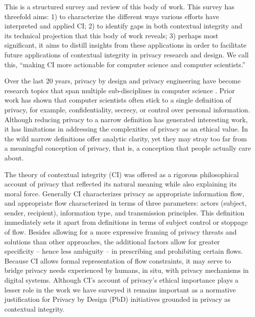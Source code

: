 \documentclass[../thesis.tex]{subfiles}
\begin{document}
This is a structured survey and review of this body of work. This survey
has threefold aims: 1) to characterize the different ways various
efforts have interpreted and applied CI; 2) to identify gaps in both
contextual integrity and its technical projection that this body of
work reveals; 3) perhaps most significant, it aims to distill insights
from these applications in order to facilitate future applications of
contextual integrity in privacy research and design. We call this,
``making CI more actionable for computer science and
computer scientists.''

Over the last 20 years, privacy by design \citep{cavoukian2009whole,
federalprotecting, regulation2016regulation} and privacy engineering
\citep{gurses2016privacy} have become research topics that span
multiple sub-disciplines in computer science
\citep{rubinstein2010privacy, danezis2015privacy}.
Prior work has shown that computer scientists often stick
to a single definition of privacy, for example, confidentiality,
secrecy, or control over personal information. Although reducing
privacy to a narrow definition has generated interesting work, it has
limitations in addressing the complexities of privacy as an ethical
value. In the wild narrow definitions offer analytic clarity, yet they
may stray too far from a meaningful conception of privacy, that is, a
conception that people actually care about. 

The theory of contextual integrity (CI) was offered as a rigorous
philosophical account of privacy that reflected its natural meaning
while also explaining its moral force. Generally CI characterizes
privacy as appropriate information flow, and appropriate flow
characterized in terms of three parameters: actors (subject, sender,
recipient), information type, and transmission principles. This
definition immediately sets it apart from definitions in terms of
subject control or stoppage of flow. Besides allowing for a more
expressive framing of privacy threats and solutions than other
approaches, the additional factors allow for greater specificity --
hence less ambiguity -- in prescribing and prohibiting certain flows.
Because CI allows formal representation of flow constraints, it may
serve to bridge privacy needs experienced by humans, in situ, with
privacy mechanisms in digital systems. Although CI's
account of privacy's ethical importance plays a lesser
role in the work we have surveyed it remains important as a normative
justification for Privacy by Design (PbD) initiatives grounded in
privacy as contextual integrity.
\end{document}
